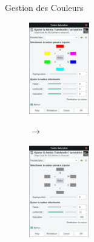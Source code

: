 \documentclass[10pt,svgnames,usenames,table]{beamer}
\begin{document}
	\begin{frame}{Gestion des Couleurs}

		\begin{figure}[H]
			\centering
			\begin{minipage}{.5\textwidth}
				\centering
				\includegraphics[height=150px]{Images/colours/col3} 
				\end{minipage}$\rightarrow$%
			\begin{minipage}{.5\textwidth}
				\centering
				\includegraphics[height=150px]{Images/colours/col4} 
				\end{minipage}
			\end{figure}	
	\end{frame}
\end{document}
